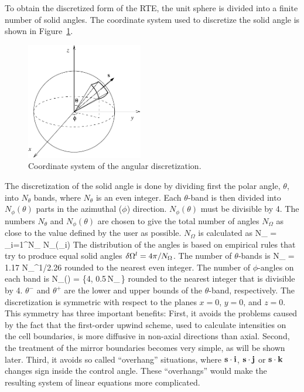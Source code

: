 To obtain the discretized form of the
RTE, the unit sphere is divided into a finite number of solid angles.
The coordinate system used to discretize the solid angle is
shown in Figure~\ref{Angular}.
\begin{figure}[ht]
\begin{center}
\includegraphics[height=2in]{FIGURES/RadCoord}
\caption{Coordinate system of the angular discretization.}
\label{Angular}
\end{center}
\end{figure}
The discretization of the solid angle is done by dividing first
the polar angle, $\theta$, into $N_{\theta}$ bands, where
$N_{\theta}$ is an even integer.
Each $\theta$-band is then divided into
$N_{\phi}(\theta)$ parts in the azimuthal ($\phi$) direction.
$N_{\phi}(\theta)$ must be divisible by 4.
The numbers $N_{\theta}$ and $N_{\phi}(\theta)$ are chosen
to give the total number of angles $N_{\Omega}$ as close to
the value defined by the user as possible.
$N_{\Omega}$ is calculated as
\be
 N_{\Omega} = \sum_{i=1}^{N_{\theta}} N_{\phi}(\theta_i)
\ee
The distribution of the angles is based on empirical rules that try
to produce equal solid angles $\delta {\Omega}^l = 4\pi/N_{\Omega}$. The
number of $\theta$-bands is
\be
 N_{\theta} = 1.17 \; N_{\Omega}^{1/2.26}
\ee
rounded to the nearest even integer. The number of $\phi$-angles
on each band is
\be
 N_{\phi}(\theta) = \max\left\{4,
        0.5\,N_{\Omega}\,\left[\cos(\theta^-)-\cos(\theta^+)\right]\right\}
\ee
rounded to the nearest integer that is divisible by 4.
$\theta^-$ and $\theta^+$ are
the lower and upper bounds of the $\theta$-band, respectively.
The discretization is symmetric with respect to the planes $x=0$, $y=0$, and
$z=0$. This symmetry has three important benefits:
First, it avoids the problems caused by the fact that the first-order
upwind scheme, used to calculate intensities on the cell boundaries,
is more diffusive in non-axial directions than axial.
Second, the treatment of the mirror boundaries becomes very simple, as
will be shown later. Third,
it avoids so called
``overhang'' situations, where ${\bf s}\cdot {\bf i}$, ${\bf s}\cdot {\bf j}$
or ${\bf s}\cdot {\bf k}$ changes sign inside
the control angle. These ``overhangs'' would make the resulting system of
linear equations more complicated.

